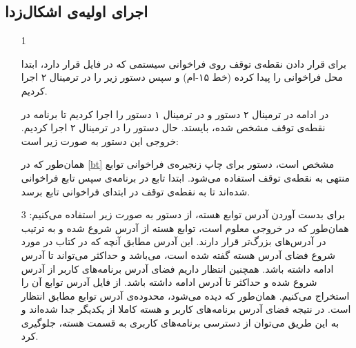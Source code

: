 \subsection*{اجرای اولیه‌ی اشکال‌زدا}
\begin{itemize}
	\item[1]

	برای قرار دادن نقطه‌ی توقف روی فراخوانی سیستمی 
	که در فایل 
	قرار دارد، ابتدا محل فراخوانی را پیدا کرده (خط ۱۵-ام) و سپس دستور زیر را در ترمینال ۲ اجرا کردیم.
	
	\begin{latin}
		
	\end{latin}
	
	در ادامه در ترمینال ۲ دستور 
	و در ترمینال ۱ دستور 
	را اجرا کردیم تا برنامه در نقطه‌ی توقف مشخص شده، بایستد. حال دستور 
	را در ترمینال ۲ اجرا کردیم. خروجی این دستور به صورت زیر است:
	
	\begin{latin}
		
	\end{latin}

	همان‌طور که در 
	\ref{bt} 
	مشخص است، دستور 
	برای چاپ زنجیره‌ی فراخوانی توابع منتهی به نقطه‌ی توقف استفاده می‌شود. ابتدا تابع 
	در برنامه‌ی 
	سپس تابع 
	فراخوانی شده‌اند تا به نقطه‌ی توقف در ابتدای‌ فراخوانی تابع 
	برسد.
	
	\item[3]
	برای بدست آوردن آدرس توابع هسته، از دستور 
	به صورت زیر استفاده می‌کنیم: 
	\lr{}
	همان‌طور که در خروجی معلوم است، توابع هسته از آدرس 
	شروع شده و به ترتیب در آدرس‌های بزرگ‌تر قرار دارند. این آدرس مطابق آنچه که در کتاب 
	در مورد شروع فضای آدرس 
	هسته گفته شده است، می‌باشد و حداکثر می‌تواند تا آدرس 
	ادامه داشته باشد. همچنین انتظار داریم فضای آدرس برنامه‌های کاربر از آدرس 
	شروع شده و حداکثر تا آدرس 
	ادامه داشته باشد. از فایل 
	آدرس توابع آن را استخراج می‌کنیم. همان‌طور که دیده‌ می‌شود، محدوده‌ی آدرس توابع مطابق انتظار است.
	\lr{}
	در نتیجه فضای آدرس برنامه‌های کاربر و هسته کاملا از یکدیگر جدا شده‌اند و به این طریق می‌توان از دسترسی برنامه‌های کاربری به قسمت هسته، جلوگیری کرد.
\end{itemize}
